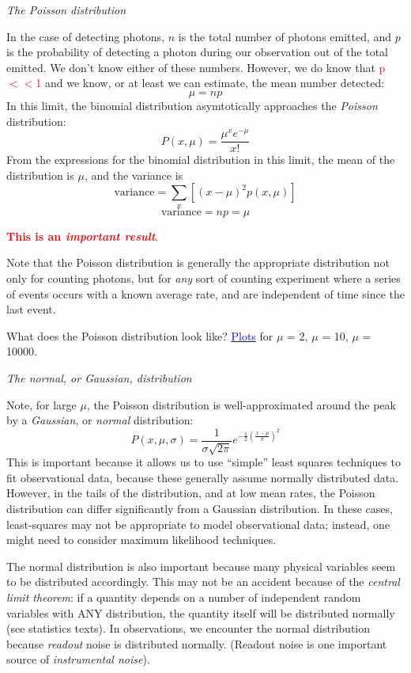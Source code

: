 \documentclass[12pt]{article}
\begin{document}
\emph{The Poisson distribution}

In the case of detecting photons, $n$ is the total number of
photons emitted, and $p$ is the probability of detecting a photon during
our observation out of the total emitted. We don't know either of
these numbers. However, we do know that
\textcolor{red}{p$<<$1} and we know, or at
least we can estimate, the mean number detected:
  $$  \mu = np $$
In this limit, the binomial distribution asymtotically approaches the
\emph{Poisson} distribution:
   $$  P(x,\mu) = \frac{\mu^x e^{-\mu}}{x!} $$
From the expressions for the binomial distribution in this limit, the
mean of the distribution is $\mu$, and the variance is
  $$  \textrm{variance} = \sum_x [(x-\mu)^2p(x,\mu)] $$
  $$  \textrm{variance} = np = \mu  $$

\textcolor{red}{\textbf{This is an \emph{important result}}}.

Note that the Poisson distribution is generally the
appropriate distribution not only for counting photons, but for
\emph{any} sort of counting experiment where a series of events
occurs with a known average rate, and are independent of time
since the last event.

What does the Poisson distribution look like?
\href{http://astronomy.nmsu.edu/holtz/a535/html/diagrams/a535/poisson.htm}
{\textcolor{blue}{Plots}}
for $\mu$ = 2, $\mu$ = 10, $\mu$ = 10000.

\emph{The normal, or Gaussian, distribution}

Note, for large $\mu$, the Poisson distribution is
well-approximated around the peak by a \emph{Gaussian}, or
\emph{normal} distribution:
    $$ P(x,\mu,\sigma) = \frac{1}{\sigma\sqrt{2\pi}}
        e^{ -\frac{1}{2} (\frac{x-\mu}{\sigma})^2 }  $$
This is important because it allows us to use ``simple'' least squares
techniques to fit observational data, because these generally assume
normally distributed data. However, in the tails of the
distribution, and at low mean rates, the Poisson distribution can
differ significantly from a Gaussian distribution. In these cases,
least-squares may not be appropriate to model observational data;
instead, one might need to consider maximum likelihood techniques.

The normal distribution is also important because many
physical variables seem to be distributed accordingly. This may not be
an accident because of the \emph{central limit theorem}: if a quantity
depends on a number of independent random variables with ANY
distribution, the quantity itself will be distributed normally (see
statistics texts). In observations, we encounter the normal
distribution because \emph{readout} noise is distributed normally.
(Readout noise is one important source of \emph{instrumental noise}).
\end{document}
